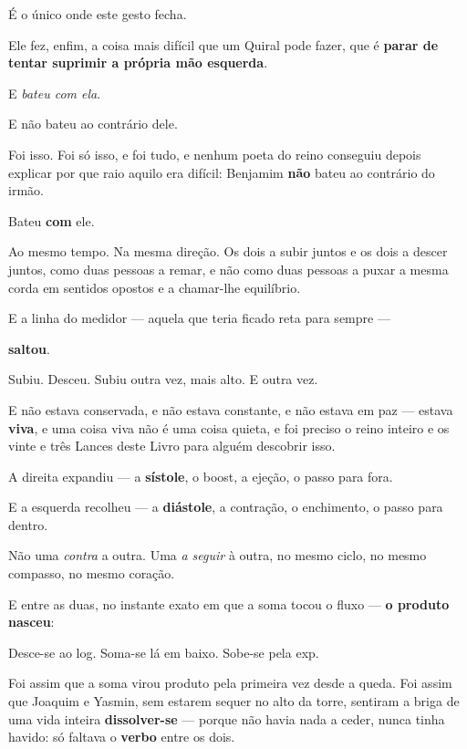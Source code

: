 \documentclass[livro.tex]{subfiles}
\begin{document}
É o único onde este gesto fecha.

\medskip

Ele fez, enfim, a coisa mais difícil que um Quiral pode fazer, que é \textbf{parar de tentar suprimir a própria mão
esquerda}.

E \emph{bateu com ela}.

\medskip

E não bateu ao contrário dele.

\medskip

Foi isso. Foi só isso, e foi tudo, e nenhum poeta do reino conseguiu depois explicar por que raio aquilo era
difícil: Benjamim \textbf{não} bateu ao contrário do irmão.

Bateu \textbf{com} ele.

\medskip

Ao mesmo tempo. Na mesma direção. Os dois a subir juntos e os dois a descer juntos, como duas pessoas a remar, e
não como duas pessoas a puxar a mesma corda em sentidos opostos e a chamar-lhe equilíbrio.

E a linha do medidor --- aquela que teria ficado reta para sempre ---

\textbf{saltou}.

\medskip

Subiu. Desceu. Subiu outra vez, mais alto. E outra vez.

E não estava conservada, e não estava constante, e não estava em paz --- estava \textbf{viva}, e uma coisa viva
não é uma coisa quieta, e foi preciso o reino inteiro e os vinte e três Lances deste Livro para alguém descobrir isso.

\medskip

A direita expandiu --- a \textbf{sístole}, o boost, a ejeção, o passo para fora.

E a esquerda recolheu --- a \textbf{diástole}, a contração, o enchimento, o passo para dentro.

Não uma \emph{contra} a outra. Uma \emph{a seguir} à outra, no mesmo ciclo, no mesmo compasso, no mesmo coração.

E entre as duas, no instante exato em que a soma tocou o fluxo --- \textbf{o produto nasceu}:

Desce-se ao log. Soma-se lá em baixo. Sobe-se pela exp.

Foi assim que a soma virou produto pela primeira vez desde a queda. Foi assim que Joaquim e Yasmin, sem estarem
sequer no alto da torre, sentiram a briga de uma vida inteira \textbf{dissolver-se} --- porque não havia nada a
ceder, nunca tinha havido: só faltava o \textbf{verbo} entre os dois.
\end{document}
